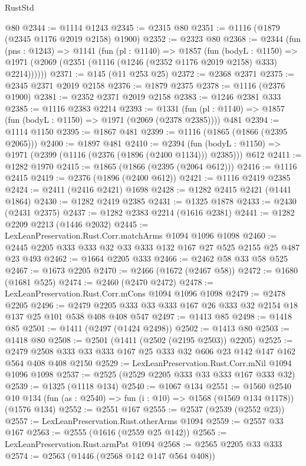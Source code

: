 \begin{lexlean}{RustStd}
\begin{coremodule}
    @80
@2344 := @1114 @1243
@2345 := @2315 @80
@2351 := @1116 (@1879 (@2345 @1176 @2019 @2158) @1900)
@2352 := @2323 @80
@2368 := @2344
    (fun (pns : @1243) =>
    @1141
      (fun (pl : @1140) =>
      @1857
        (fun (bodyL : @1150) =>
        @1971 (@2069 (@2351 (@1116 (@1246 (@2352 @1176 @2019 @2158) @333) @2214))))))
@2371 := @145 (@11 @253 @25)
@2372 := @2368 @2371
@2375 := @2345 @2371 @2019 @2158
@2376 := @1879 @2375
@2378 := @1116 (@2376 @1900)
@2381 := @2352 @2371 @2019 @2158
@2383 := @1246 @2381 @333
@2385 := @1116 @2383 @2214
@2393 := @1331 (fun (pl : @1140) => @1857 (fun (bodyL : @1150) => @1971 (@2069 (@2378 @2385)))) @481
@2394 := @1114 @1150
@2395 := @1867 @481
@2399 := @1116 (@1865 (@1866 (@2395 @2065)))
@2400 := @1897 @481
@2410 := @2394
    (fun (bodyL : @1150) => @1971 (@2399 (@1116 (@2376 (@1896 (@2400 @1134))) @2385)))
    @612
@2411 := @1282 @1970
@2415 := @1865 (@1866 (@2395 (@2064 @612)))
@2416 := @1116 @2415
@2419 := @2376 (@1896 (@2400 @612))
@2421 := @1116 @2419 @2385
@2424 := @2411 (@2416 @2421) @1698
@2428 := @1282 @2415 @2421 (@1441 @1864)
@2430 := @1282 @2419 @2385
@2431 := @1325 @1878
@2433 := @2430 (@2431 @2375)
@2437 := @1282 @2383 @2214 (@1616 @2381)
@2441 := @1282 @2209 @2213 (@1446 @2032)
@2445 := LexLeanPreservation.Rust.Corr.matchArms @1094 @1096 @1098
@2460 := @2445 @2205 @333 @333 @32 @33 @333 @132 @167 @27 @525 @2155 @25 @487 @23 @493
@2462 := @1664 @2205 @333
@2466 := @2462 @58 @33 @58 @525
@2467 := @1673 @2205
@2470 := @2466 (@1672 (@2467 @58))
@2472 := @1680 (@1681 @525)
@2474 := @2460 (@2470 @2472)
@2478 := LexLeanPreservation.Rust.Corr.mCons @1094 @1096 @1098
@2479 := @2478 @2205
@2496 := @2479 @2205 @333 @33 @333 @167 @26 @333 @32 @2154 @18 @137 @25 @101 @538 @408 @408 @547
@2497 := @1413 @85
@2498 := @1418 @85
@2501 := @1411 (@2497 (@1424 @2498))
@2502 := @1413 @80
@2503 := @1418 @80
@2508 := @2501 (@1411 (@2502 (@2195 @2503)) @2205)
@2525 := @2479 @2508 @333 @33 @333 @167 @25 @333 @32 @606 @23 @142 @147 @162 @564 @408 @408 @2150
@2529 := LexLeanPreservation.Rust.Corr.mNil @1094 @1096 @1098
@2537 := @2525 (@2529 @2205 @333 @33 @333 @167 @333 @32)
@2539 := @1325 (@1118 @134)
@2540 := @1067 @134
@2551 := @1560
    @2540
    @10
    @134
    (fun (as : @2540) => fun (i : @10) => @1568 (@1569 @134 @1178))
    (@1576 @134)
@2552 := @2551 @167
@2555 := @2537 (@2539 (@2552 @23))
@2557 := LexLeanPreservation.Rust.otherArms @1094
@2559 := @2557 @33 @167
@2563 := @2555 (@1616 (@2559 @25 @142))
@2565 := LexLeanPreservation.Rust.armPat @1094
@2568 := @2565 @2205 @33 @333
@2574 := @2563 (@1446 (@2568 @142 @147 @564 @408))

\end{coremodule}
\end{lexlean}
